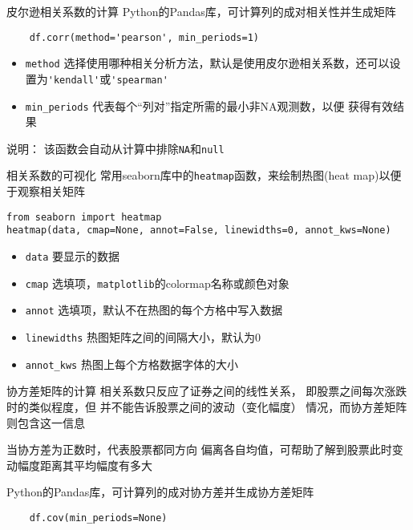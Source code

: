 \documentclass[t]{beamer}
\begin{document}
\begin{frame}[fragile]{皮尔逊相关系数的计算}
    Python的Pandas库，可计算列的成对相关性并生成矩阵
\begin{lstlisting}
    df.corr(method='pearson', min_periods=1)
\end{lstlisting}
\begin{itemize}
    \item \verb|method| 选择使用哪种相关分析方法，默认是使用皮尔逊相关系数，还可以设置为\verb|'kendall'|或\verb|'spearman'|
    \item \verb|min_periods| 代表每个“列对”指定所需的最小非NA观测数，以便
    获得有效结果
\end{itemize}

\begin{block}{说明：}
    该函数会自动从计算中排除\verb|NA|和\verb|null|
\end{block}
\end{frame}

\begin{frame}[fragile]{相关系数的可视化}
    常用seaborn库中的\verb|heatmap|函数，来绘制热图(heat map)以便于观察相关矩阵
\begin{lstlisting}
from seaborn import heatmap
heatmap(data, cmap=None, annot=False, linewidths=0, annot_kws=None)
\end{lstlisting}
\begin{itemize}
    \item \verb|data| 要显示的数据
    \item \verb|cmap| 选填项，\verb|matplotlib|的colormap名称或颜色对象
    \item \verb|annot| 选填项，默认不在热图的每个方格中写入数据
    \item \verb|linewidths| 热图矩阵之间的间隔大小，默认为0
    \item \verb|annot_kws| 热图上每个方格数据字体的大小
\end{itemize}

\end{frame}



\begin{frame}[fragile]{协方差矩阵的计算}
    相关系数只反应了证券之间的线性关系，
    即股票之间每次涨跌时的类似程度，但
    并不能告诉股票之间的波动（变化幅度）
    情况，而协方差矩阵则包含这一信息

    当协方差为正数时，代表股票都同方向
    偏离各自均值，可帮助了解到股票此时变
    动幅度距离其平均幅度有多大

    Python的Pandas库，可计算列的成对协方差并生成协方差矩阵
\begin{lstlisting}
    df.cov(min_periods=None)
\end{lstlisting}
\end{frame}
\end{document}
